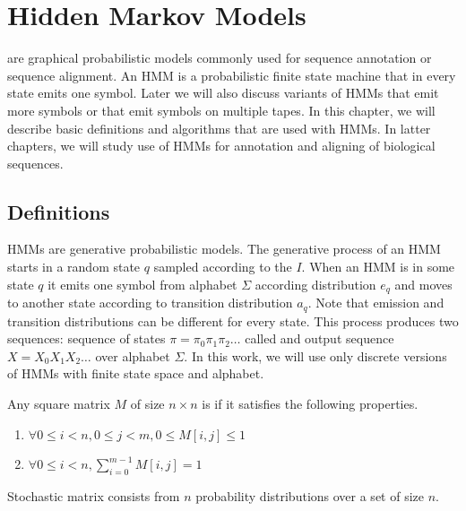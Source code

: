 \chapter{Hidden Markov Models}
\label{CHAPTER:HMM}

 are graphical probabilistic models
commonly used for sequence annotation or sequence alignment. An HMM is a
probabilistic finite state machine that in every state emits one symbol. Later
we will also discuss variants of HMMs that emit more symbols or that emit
symbols on multiple tapes. In this chapter, we will describe basic definitions
and algorithms that are used with HMMs. In latter chapters, we will study use of HMMs 
for annotation and aligning of biological sequences.

\section{Definitions}\label{SECTION:HMMDEF}
                       
HMMs are generative probabilistic models.
The generative process of an HMM starts in a random state $q$ sampled according
to the  $I$.  When an HMM is in some state $q$ it emits one symbol from
alphabet $\Sigma$ according distribution $e_q$ and moves to another state
according to transition distribution $a_q$. Note that emission and transition
distributions can be different for every state.  This process produces two
sequences: sequence of states $\pi=\pi_0\pi_1\pi_2\dots$ called
 and output sequence $X=X_0X_1X_2\dots$ over alphabet
$\Sigma$. In this work, we will use only discrete versions of HMMs with finite state
space and alphabet.  


\begin{definition}
Any square matrix $M$ of size $n\times n$ is  if it satisfies the
following properties.
\begin{enumerate}
\item $\forall 0\leq i<n,0\leq j < m, 0\leq M[i,j]\leq 1$
\item $\forall 0\le i<n, \sum_{i=0}^{m-1}M[i,j]=1$
\end{enumerate}
\end{definition}

\begin{note}
Stochastic matrix consists from $n$ probability distributions over a set of size $n$.
\end{note}

